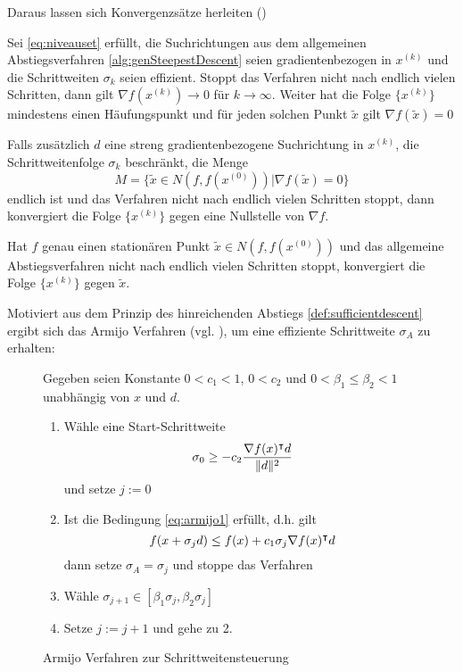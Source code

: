 Daraus lassen sich Konvergenzsätze herleiten (\cite[Satz 4.4.9]{alt2002nichtlineare})
\begin{theorem}
 Sei \eqref{eq:niveauset} erfüllt, die Suchrichtungen aus dem allgemeinen Abstiegsverfahren \ref{alg:genSteepestDescent} seien gradientenbezogen in $x^{(k)}$ und die Schrittweiten $\sigma_k$ seien effizient. Stoppt das Verfahren nicht nach endlich vielen Schritten, dann gilt $\nabla f(x^{(k)})\to 0$ für $k\to \infty$. Weiter hat die Folge $\{x^{(k)}\}$ mindestens einen Häufungspunkt und für jeden solchen Punkt $\tilde x$ gilt $\nabla f(\tilde x) = 0$

Falls zusätzlich $d$ eine streng gradientenbezogene Suchrichtung in $x^{(k)}$, die Schrittweitenfolge $\sigma_k$ beschränkt, die Menge 
$$M = \{\tilde x\in N(f,f(x^{(0)}))|\nabla f(\tilde x)=0\}$$ endlich ist und das Verfahren nicht nach endlich vielen Schritten stoppt, dann konvergiert die Folge $\{x^{(k)}\}$ gegen eine Nullstelle von $\nabla f$.

 Hat $f$ genau einen stationären Punkt $\tilde x \in N(f,f(x^{(0)}))$ und das allgemeine Abstiegsverfahren nicht nach endlich vielen Schritten stoppt, konvergiert die Folge $\{x^{(k)}\}$ gegen $\tilde x$.
 \end{theorem}
 
Motiviert aus dem Prinzip des hinreichenden Abstiegs \ref{def:sufficientdescent} ergibt sich das Armijo Verfahren (vgl. \cite[Verfahren 4.5.4]{alt2002nichtlineare}), um eine effiziente Schrittweite $\sigma_A$ zu erhalten:
\begin{figure}[H]
 Gegeben seien Konstante $0<c_1<1$, $0<c_2$ und $0<\beta_1\leq \beta_2 <1$ unabhängig von $x$ und $d$.
 \begin{enumerate}
  \item Wähle eine Start-Schrittweite 
  \[
   \sigma_0 \geq -c_2 \frac{\nabla f(x)^\intercal d}{\|d\|^2}
  \]
  und setze $j:=0$
  \item Ist die Bedingung \eqref{eq:armijo1} erfüllt, d.h. gilt
  \[
   f(x+\sigma_j d)\leq f(x)+ c_1\sigma_j \nabla f(x)^\intercal d
  \]
  dann setze $\sigma_A = \sigma_j$ und stoppe das Verfahren
  \item Wähle $\sigma_{j+1}\in [\beta_1\sigma_j,\beta_2\sigma_j]$
  \item Setze $j:=j+1$ und gehe zu 2.
 \end{enumerate}
\caption{Armijo Verfahren zur Schrittweitensteuerung}
\end{figure}



